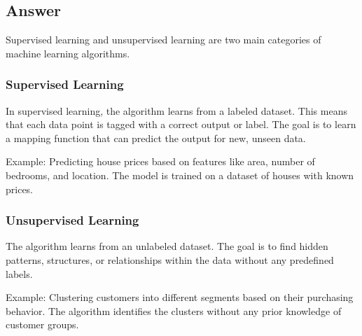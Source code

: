 
\subsection*{Answer}

Supervised learning and unsupervised learning are two main categories of machine learning algorithms.

\subsubsection*{Supervised Learning}
In supervised learning, the algorithm learns from a labeled dataset. This means that each data point is tagged with a correct output or label. The goal is to learn a mapping function that can predict the output for new, unseen data.

Example: Predicting house prices based on features like area, number of bedrooms, and location. The model is trained on a dataset of houses with known prices.

\subsubsection*{Unsupervised Learning}
The algorithm learns from an unlabeled dataset. The goal is to find hidden patterns, structures, or relationships within the data without any predefined labels.

Example: Clustering customers into different segments based on their purchasing behavior. The algorithm identifies the clusters without any prior knowledge of customer groups.
